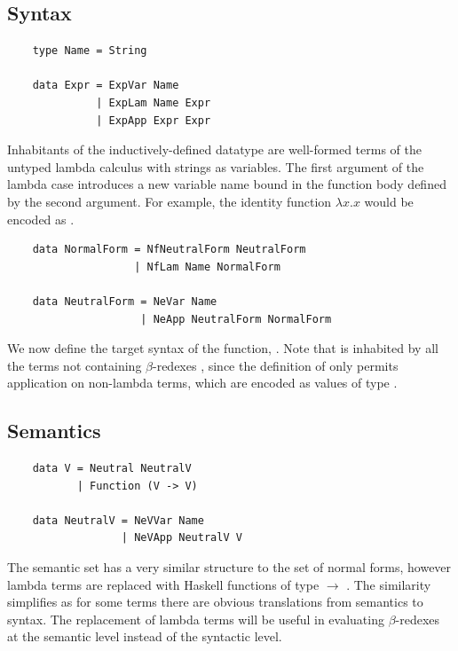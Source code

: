 \subsection{Syntax}

\begin{lstlisting}
    type Name = String

    data Expr = ExpVar Name
              | ExpLam Name Expr
              | ExpApp Expr Expr
\end{lstlisting}

Inhabitants of the inductively-defined datatype  are well-formed terms of the untyped lambda calculus with strings as variables. The first argument of the lambda case introduces a new variable name bound in the function body defined by the second argument. For example, the identity function $\lambda x . x$ would be encoded as .

\begin{lstlisting}
    data NormalForm = NfNeutralForm NeutralForm
                    | NfLam Name NormalForm

    data NeutralForm = NeVar Name
                     | NeApp NeutralForm NormalForm
\end{lstlisting}

We now define the target syntax of the  function, . Note that  is inhabited by all the terms not containing $\beta$-redexes \cite{slides}, since the definition of  only permits application on non-lambda terms, which are encoded as values of type .

\subsection{Semantics}

\begin{lstlisting}
    data V = Neutral NeutralV
           | Function (V -> V)

    data NeutralV = NeVVar Name
                  | NeVApp NeutralV V
\end{lstlisting}


The semantic set  has a very similar structure to the set of normal forms, however lambda terms are replaced with Haskell functions of type  $\rightarrow$ .
The similarity simplifies  as for some terms there are obvious translations from semantics to syntax. The replacement of lambda terms will be useful in evaluating $\beta$-redexes at the semantic level instead of the syntactic level. 

